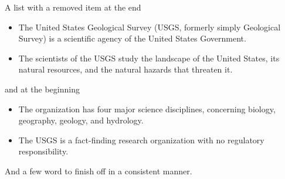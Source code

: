 \documentclass{article}
\begin{document}
A list with a removed item at the end
\begin{itemize}
\item The United States Geological Survey (USGS, formerly simply Geological Survey) is a scientific agency of the United States Government. 
\item The scientists of the USGS study the landscape of the United States, its natural resources, and the natural hazards that threaten it. 
\end{itemize}
and at the beginning
\begin{itemize}
\item The organization has four major science disciplines, concerning biology, geography, geology, and hydrology. 
\item The USGS is a fact-finding research organization with no regulatory responsibility.
\end{itemize}

And a few word to finish off in a consistent manner.
\end{document}
